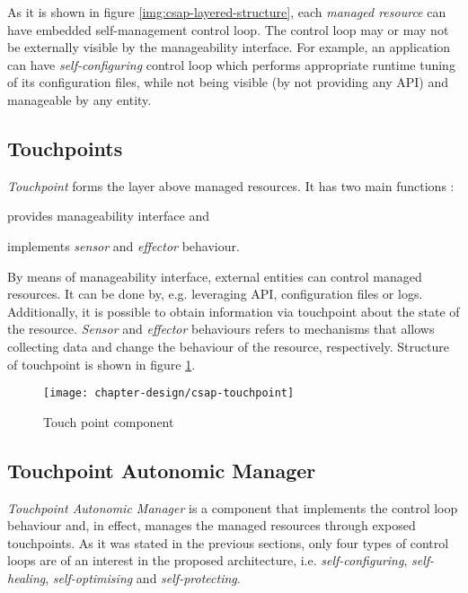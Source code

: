 As it is shown in figure \ref{img:csap-layered-structure}, each \emph{managed resource} can have embedded self-management control loop. The control loop may or may not be externally visible by the manageability interface. For example, an application can have \emph{self-configuring} control loop which performs appropriate runtime tuning of its configuration files, while not being visible (by not providing any API) and manageable by any entity.

\subsection{Touchpoints}
\emph{Touchpoint} forms the layer above managed resources. It has two main functions \cite{IBM06}:
\begin{inparaenum}[1)]
\item provides manageability interface and
\item implements \emph{sensor} and \emph{effector} behaviour.
\end{inparaenum}

By means of manageability interface, external entities can control managed resources. It can be done by, e.g. leveraging API, configuration files or logs. Additionally, it is possible to obtain information via touchpoint about the state of the resource. \emph{Sensor} and \emph{effector} behaviours refers to mechanisms that allows collecting data and change the behaviour of the resource, respectively. Structure of touchpoint is shown in figure \ref{img:csap-touchpoint}.

\begin{figure}[!ht]
  \begin{center}
    \texttt{[image: chapter-design/csap-touchpoint]}
  \end{center}
  \caption{Touch point component}
  \label{img:csap-touchpoint}
\end{figure}

\subsection{Touchpoint Autonomic Manager}
\emph{Touchpoint Autonomic Manager} is a component that implements the control loop behaviour and, in effect, manages the managed resources through exposed touchpoints. As it was stated in the previous sections, only four types of control loops are of an interest in the proposed architecture, i.e. \emph{self-configuring}, \emph{self-healing}, \emph{self-optimising} and \emph{self-protecting}.

